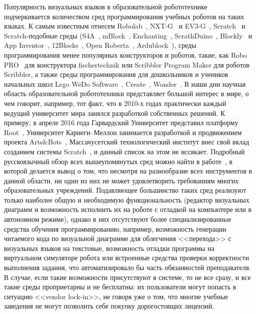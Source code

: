 \documentclass[conference]{IEEEtran}
\begin{document}
Популярность визуальных языков в образовательной робототехнике подчеркивается количеством сред программирования учебных роботов на таких языках. К самым известным отнесем Robolab~\cite{erwin2000lego}, NXT-G~\cite{kelly2010lego} и EV3-G~\cite{valk2014lego}, Scratch~\cite{resnick2009scratch} и Scratch-подобные среды (S4A~\cite{s4a}, mBlock~\cite{mblock}, Enchanting~\cite{enchanting}, ScrathDuino~\cite{scratchduino}, Blockly~\cite{blockly} и App Inventor~\cite{wolber2011app}, 12Blocks~\cite{12blocks}, Open Roberta~\cite{jost2014graphical}, Ardublock~\cite{ardublock}), среды программирования менее популярных конструкторов и роботов, такие, как Robo PRO~\cite{chang2006incorporating} для конструктора fischertechnik или Scribbler Program Maker для роботов Scribbler, а также среды программирования для дошкольников и учеников начальных школ Lego WeDo Software~\cite{mayerova2012pilot}, Create~\cite{cross2013visual}, Wonder~\cite{wonder}. В наши дни научная область образовательной робототехники представляет большой интерес в мире, о чем говорит, например, тот факт, что в 2010-х годах практически каждый ведущий университет мира занялся разработкой собственных решений. К примеру, в апреле 2016 года Гарвардский Университет представил платформу Root~\cite{root}, Университет Карнеги--Меллон занимается разработкой и продвижением проекта Arts\&Bots~\cite{cross2013visual}, Массачусетский технологический институт внес свой вклад созданием системы Scratch~\cite{resnick2009scratch}, и данный список на этом не иссякает. Подробный русскоязычный обзор всех вышеупомянутых сред можно найти в работе~\cite{mordvinov2016NONPUBLISHED}, в которой делается вывод о том, что несмотря на разнообразие всех инструментов в данной области, ни один из них не может удовлетворить требованиям многих образовательных учреждений. Подавляющее большинство таких сред реализуют только наиболее общую и необходимую функциональность (редактор визуальных диаграмм и возможность исполнить их на роботе с отладкой на компьютере или в автономном режиме), однако в них отсутствуют более специализированные средства обучения программированию, например, возможность генерации читаемого кода по визуальной диаграмме для облегчения <<перехода>> с визуальных языков на текстовые, возможность отладки программы на виртуальном симуляторе робота или встроенные средства проверки корректности выполнения задания, что автоматизировало бы часть обязанностей преподавателя. В случае, если такие возможности присутствуют в системе, то не все сразу, и все такие среды проприетарны и не бесплатны: их пользователи могут попасть в ситуацию <<vendor lock-in>>, не говоря уже о том, что многие учебные заведения не могут позволить себе покупку дорогостоящих лицензий. 
\end{document}
